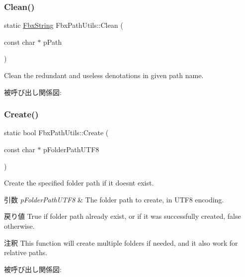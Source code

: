 \subsubsection{\texorpdfstring{Clean()}{Clean()}}
{\footnotesize\ttfamily static \hyperlink{class_fbx_string}{Fbx\+String} Fbx\+Path\+Utils\+::\+Clean (\begin{DoxyParamCaption}\item[{const char $\ast$}]{p\+Path }\end{DoxyParamCaption})\hspace{0.3cm}{\ttfamily [static]}}



Clean the redundant and useless denotations in given path name. 

被呼び出し関係図\+:
\mbox{\label{class_fbx_path_utils_aa644a8ad1e94eb8a522e6fd653824e93}} 
\subsubsection{\texorpdfstring{Create()}{Create()}}
{\footnotesize\ttfamily static bool Fbx\+Path\+Utils\+::\+Create (\begin{DoxyParamCaption}\item[{const char $\ast$}]{p\+Folder\+Path\+U\+T\+F8 }\end{DoxyParamCaption})\hspace{0.3cm}{\ttfamily [static]}}

Create the specified folder path if it doesn\textquotesingle{}t exist. 
\begin{DoxyParams}{引数}
{\em p\+Folder\+Path\+U\+T\+F8} & The folder path to create, in U\+T\+F8 encoding. \\
\hline
\end{DoxyParams}
\begin{DoxyReturn}{戻り値}
True if folder path already exist, or if it was successfully created, false otherwise. 
\end{DoxyReturn}
\begin{DoxyRemark}{注釈}
This function will create multiple folders if needed, and it also work for relative paths. 
\end{DoxyRemark}
被呼び出し関係図\+:
\mbox{\label{class_fbx_path_utils_a7061a14d4a9f5dae1353d16d7155ee06}} 
